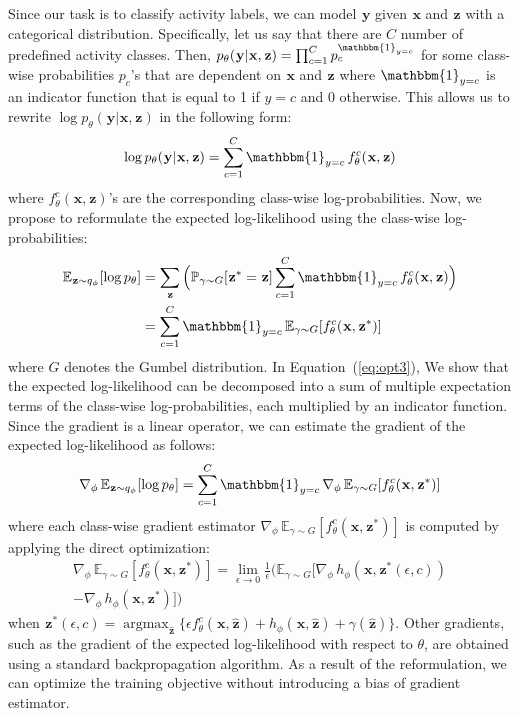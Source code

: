 \documentclass[10pt,twocolumn,letterpaper]{article}
\newcommand{\varx}{\mathbf{\mspace{1mu}x}}
\newcommand{\vary}{\mathbf{\mspace{1mu}y}}
\newcommand{\varz}{\mathbf{\mspace{1mu}z}}
\DeclareMathOperator*{\argmax}{argmax}
\begin{document}
Since our task is to classify activity labels, we can model $\vary$ given $\varx$ and $\varz$ with a categorical distribution. Specifically, let us say that there are $C$ number of predefined activity classes. Then, $p_{\theta}(\vary|\varx,\varz)=\prod_{c=1}^{C}p_{c}^{\mathbbm{1}_{y=c}}$ for some class-wise probabilities $p_{c}$'s that are dependent on $\varx$ and $\varz$ where $\mathbbm{1}_{y=c}$ is an indicator function that is equal to 1 if $y=c$ and 0 otherwise. This allows us to rewrite $\log p_{\theta}(\vary|\varx,\varz)$ in the following form:
\begin{equation}
\label{eq:opt2}
\log p_{\theta}(\vary|\varx,\varz)=\sum_{c=1}^{C}\mathbbm{1}_{y=c} \, f_{\theta}^{c}(\varx,\varz)
\end{equation}
where $f_{\theta}^{c}(\varx,\varz)$'s are the corresponding class-wise log-probabilities. Now, we propose to reformulate the expected log-likelihood using the class-wise log-probabilities:
\begin{align}
\mathbb{E}_{\varz \sim q_{\phi}}[\log p_{\theta}] 
&= \sum_{\varz} \Big( \mathbb{P}_{\gamma \sim G}[\varz^* = \varz] \sum_{c=1}^{C}\mathbbm{1}_{y=c} \, f_{\theta}^{c}(\varx,\varz) \Big) \nonumber \\
\label{eq:opt3}
&= \sum_{c=1}^{C} \mathbbm{1}_{y=c} \, \mathbb{E}_{\gamma \sim G}[f_{\theta}^{c}(\varx,\varz^*)]
\end{align}
where $G$ denotes the Gumbel distribution. In Equation~(\ref{eq:opt3}), We show that the expected log-likelihood can be decomposed into a sum of multiple expectation terms of the class-wise log-probabilities, each multiplied by an indicator function. Since the gradient is a linear operator, we can estimate the gradient of the expected log-likelihood as follows:
\begin{equation}
\label{eq:opt4}
\nabla_{\phi} \, \mathbb{E}_{\varz \sim q_{\phi}}[\log p_{\theta}] 
= \sum_{c=1}^{C} \mathbbm{1}_{y=c} \, \nabla_{\phi} \, \mathbb{E}_{\gamma \sim G}[f_{\theta}^{c}(\varx,\varz^*)]
\end{equation}
where each class-wise gradient estimator $\nabla_{\phi} \, \mathbb{E}_{\gamma \sim G}[f_{\theta}^{c}(\varx,\varz^*)]$ is computed by applying the direct optimization:
\begin{multline}
\label{eq:opt5}
\nabla_{\phi} \, \mathbb{E}_{\gamma \sim G}[f_{\theta}^{c}(\varx,\varz^*)] = \lim\limits_{\epsilon \to 0} \frac{1}{\epsilon} \Big( \mathbb{E}_{\gamma \sim G}\big[\nabla_{\phi} \, h_{\phi} (\varx,\varz^*(\epsilon,c))
\\ - \nabla_{\phi} \, h_{\phi}(\varx,\varz^*) \big] \Big)
\end{multline}
when $\varz^*(\epsilon,c)=\argmax_{\hat{\varz}} \{ \epsilon f_{\theta}^{c}(\varx,\hat{\varz}) +  h_{\phi}(\varx,\hat{\varz}) +\gamma(\hat{\varz})\}$. Other gradients, such as the gradient of the expected log-likelihood with respect to $\theta$, are obtained using a standard backpropagation algorithm. As a result of the reformulation, we can optimize the training objective without introducing a bias of gradient estimator.
\end{document}

